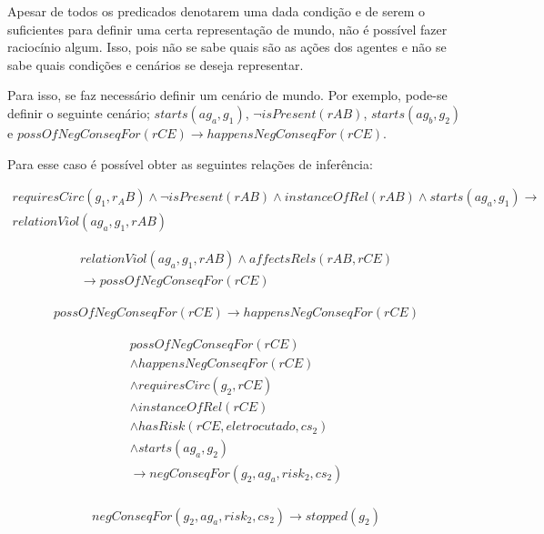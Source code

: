 Apesar de todos os predicados denotarem uma dada condição e de serem o suficientes para definir uma certa representação de mundo, não é possível fazer raciocínio algum. Isso, pois não se sabe quais são as ações dos agentes e não se sabe quais condições e cenários se deseja representar.  

Para isso, se faz necessário definir um cenário de mundo. Por exemplo, pode-se definir o seguinte cenário; $starts(ag_a,g_1)$, $\neg isPresent(rAB)$, $starts(ag_b,g_2)$ e $ possOfNegConseqFor(rCE) \to happensNegConseqFor(rCE)$. 

Para esse caso é possível obter as seguintes relações de inferência: 

\begin{eqnarray}
    requiresCirc(g_1,r_AB)\wedge 
    \neg isPresent(rAB) \wedge 
    instanceOfRel(rAB) \wedge 
    starts(ag_a,g_1) \to \nonumber \\
    relationViol(ag_a,g_1,rAB) 
\end{eqnarray}

\begin{eqnarray}
    relationViol(ag_a,g_1,rAB)  \wedge 
    affectsRels(rAB,rCE) \nonumber \\
    \to possOfNegConseqFor(rCE)  
\end{eqnarray}

\begin{eqnarray}
    possOfNegConseqFor(rCE) \to happensNegConseqFor(rCE) 
\end{eqnarray}

\begin{eqnarray}\label{paybutiamnotguilty}
   possOfNegConseqFor(rCE) \nonumber \\
   \wedge happensNegConseqFor(rCE) \nonumber \\ 
   \wedge requiresCirc(g_2,rCE) \nonumber \\  
   \wedge instanceOfRel(rCE) \nonumber \\ 
   \wedge hasRisk(rCE,eletrocutado,cs_2) \nonumber \\  
   \wedge starts(ag_a,g_2) \nonumber \\ 
   \to negConseqFor(g_2,ag_a,risk_2,cs_2) \\ \nonumber
\end{eqnarray}


\begin{eqnarray}\label{badcons}
    negConseqFor(g_2,ag_a,risk_2,cs_2) \to stopped(g_2) 
\end{eqnarray}


